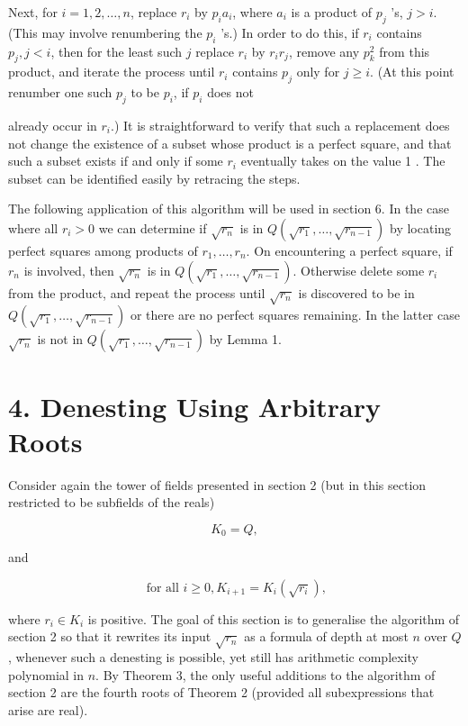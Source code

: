 \documentclass[11pt,letterpaper]{article}
\begin{document}
Next, for $i=1,2, \ldots, n$, replace $r_{i}$ by $p_{i} a_{i}$, where $a_{i}$ is a product of $p_{j}$ 's, $j>i$. (This may involve renumbering the $p_{i}$ 's.) In order to do this, if $r_{i}$ contains $p_{j}, j<i$, then for the least such $j$ replace $r_{i}$ by $r_{i} r_{j}$, remove any $p_{k}^{2}$ from this product, and iterate the process until $r_{i}$ contains $p_{j}$ only for $j \geqslant i$. (At this point renumber one such $p_{j}$ to be $p_{i}$, if $p_{i}$ does not

already occur in $r_{i}$.) It is straightforward to verify that such a replacement does not change the existence of a subset whose product is a perfect square, and that such a subset exists if and only if some $r_{i}$ eventually takes on the value 1 . The subset can be identified easily by retracing the steps.

The following application of this algorithm will be used in section 6. In the case where all $r_{i}>0$ we can determine if $\sqrt{r_{n}}$ is in $Q\left(\sqrt{r_{1}}, \ldots, \sqrt{r_{n-1}}\right)$ by locating perfect squares among products of $r_{1}, \ldots, r_{n}$. On encountering a perfect square, if $r_{n}$ is involved, then $\sqrt{r_{n}}$ is in $Q\left(\sqrt{r_{1}}, \ldots, \sqrt{r_{n-1}}\right)$. Otherwise delete some $r_{i}$ from the product, and repeat the process until $\sqrt{r_{n}}$ is discovered to be in $Q\left(\sqrt{r_{1}}, \ldots, \sqrt{r_{n-1}}\right)$ or there are no perfect squares remaining. In the latter case $\sqrt{r_{n}}$ is not in $Q\left(\sqrt{r_{1}}, \ldots, \sqrt{r_{n-1}}\right)$ by Lemma 1.

\section*{4. Denesting Using Arbitrary Roots}
Consider again the tower of fields presented in section 2 (but in this section restricted to be subfields of the reals)

\[
K_{0}=Q,
\]

and

\[
\text { for all } i \geqslant 0, K_{i+1}=K_{i}\left(\sqrt{r_{i}}\right),
\]

where $r_{i} \in K_{i}$ is positive. The goal of this section is to generalise the algorithm of section 2 so that it rewrites its input $\sqrt{r_{n}}$ as a formula of depth at most $n$ over $Q$, whenever such a denesting is possible, yet still has arithmetic complexity polynomial in $n$. By Theorem 3, the only useful additions to the algorithm of section 2 are the fourth roots of Theorem 2 (provided all subexpressions that arise are real).
\end{document}
